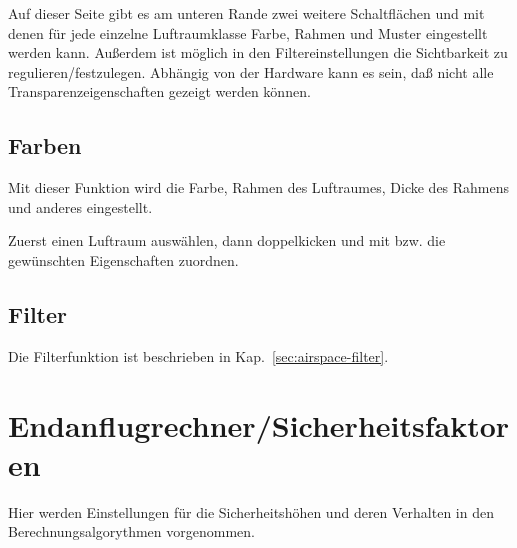 Auf dieser Seite gibt es am unteren Rande zwei weitere Schaltflächen   und
  mit denen für jede einzelne Luftraumklasse Farbe, Rahmen und Muster
 eingestellt werden kann.
 Außerdem ist möglich in den Filtereinstellungen die Sichtbarkeit zu regulieren/festzulegen.
Abhängig von der Hardware kann es sein, daß nicht alle Transparenzeigenschaften gezeigt
werden können.

\subsection*{Farben}
Mit dieser Funktion wird die Farbe, Rahmen des Luftraumes,  Dicke des Rahmens und
anderes eingestellt.

Zuerst einen Luftraum auswählen, dann doppelkicken und mit   bzw.
 die gewünschten Eigenschaften zuordnen.

\subsection*{Filter}
Die Filterfunktion ist beschrieben in Kap.~\ref{sec:airspace-filter}.

\section{Endanflugrechner/Sicherheitsfaktoren}
Hier werden Einstellungen für die Sicherheitshöhen und deren Verhalten in den Berechnungsalgorythmen vorgenommen.

